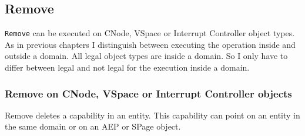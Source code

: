 \subsection{Remove}\label{sec:Remove}
\texttt{Remove} can be executed on CNode, VSpace or Interrupt Controller object types. \\
As in previous chapters I distinguish between executing the operation inside and outside a domain. All legal object types are inside a domain. So I only have to differ between legal and not legal for the execution inside a domain. 
\subsubsection{Remove on CNode, VSpace or Interrupt Controller objects} 
Remove deletes a capability in an entity. This capability can point on an entity in the same domain or on an AEP or SPage object. 
